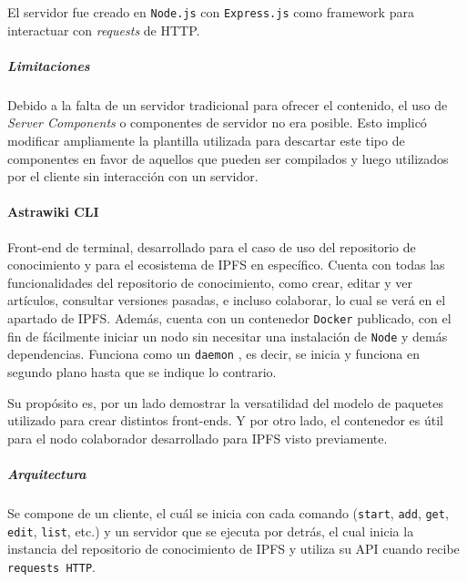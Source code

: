 El servidor fue creado en \texttt{Node.js} con \texttt{Express.js} como framework para interactuar con \textit{requests} de HTTP.

\subparagraph{Limitaciones} Debido a la falta de un servidor tradicional para ofrecer el contenido, el uso de \textit{Server Components} o componentes de servidor \cite{server-components} no era posible. Esto implicó modificar ampliamente la plantilla utilizada para descartar este tipo de componentes en favor de aquellos que pueden ser compilados y luego utilizados por el cliente sin interacción con un servidor.

\paragraph{Astrawiki CLI}

Front-end de terminal, desarrollado para el caso de uso del repositorio de conocimiento y para el ecosistema de IPFS en específico. Cuenta con todas las funcionalidades del repositorio de conocimiento, como crear, editar y ver artículos, consultar versiones pasadas, e incluso colaborar, lo cual se verá en el apartado de IPFS. Además, cuenta con un contenedor \texttt{Docker} publicado, con el fin de fácilmente iniciar un nodo sin necesitar una instalación de \texttt{Node} y demás dependencias. Funciona como un \texttt{daemon} \cite{daemon}, es decir, se inicia y funciona en segundo plano hasta que se indique lo contrario.

Su propósito es, por un lado demostrar la versatilidad del modelo de paquetes utilizado para crear distintos front-ends. Y por otro lado, el contenedor es útil para el nodo colaborador desarrollado para IPFS visto previamente.

\subparagraph{Arquitectura} Se compone de un cliente, el cuál se inicia con cada comando (\texttt{start}, \texttt{add}, \texttt{get}, \texttt{edit}, \texttt{list}, etc.) y un servidor que se ejecuta por detrás, el cual inicia la instancia del repositorio de conocimiento de IPFS y utiliza su API cuando recibe \texttt{requests HTTP}.

